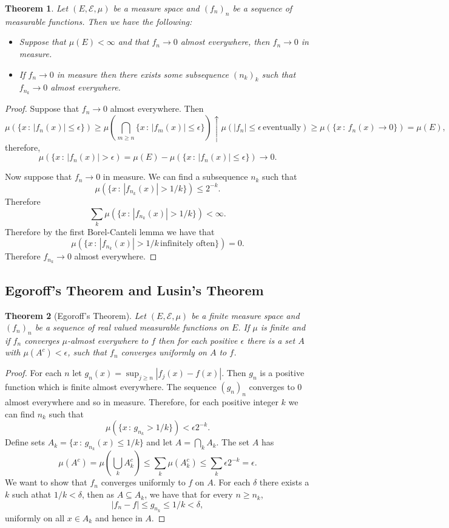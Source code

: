 \documentclass[11pt]{article}
\newtheorem{thm}{Theorem}[section]
\theoremstyle{definition}
\theoremstyle{remark}
\begin{document}
\begin{thm}
Let $(E, \mathcal{E}, \mu)$ be a measure space and $(f_n)_n$ be a sequence of measurable functions. Then we have the following:
\begin{itemize}
\item Suppose that $\mu(E) < \infty$ and that $f_n \rightarrow 0$ almost everywhere, then $f_n \rightarrow 0$ in measure.
\item If $f_n \rightarrow 0$ in measure then there exists some subsequence $(n_k)_k$ such that $f_{n_k} \rightarrow 0$ almost everywhere.
\end{itemize}
\end{thm}
\begin{proof}
Suppose that $f_n \rightarrow 0$ almost everywhere. Then 
\[ \mu(\{ x\,:\, |f_n(x)| \leq \epsilon \}) \geq \mu \left( \bigcap_{m \geq n} \{ x \,:\, |f_m(x)| \leq \epsilon\}\right) \uparrow \mu \left(|f_n| \leq \epsilon \, \mbox{eventually} \right) \geq \mu(\{ x \,:\, f_n(x) \rightarrow 0\}) = \mu(E), \] therefore,
\[ \mu(\{ x\,:\, |f_n(x)|> \epsilon) = \mu(E) - \mu(\{ x\,:\, |f_n(x)| \leq \epsilon \}) \rightarrow 0. \]

Now suppose that $f_n \rightarrow 0$ in measure. We can find a subsequence $n_k$ such that
\[ \mu(\{ x \,:\, |f_{n_k}(x)| > 1/k \}) \leq 2^{-k}. \] Therefore
\[ \sum_k \mu(\{ x \,:\, |f_{n_k}(x)| > 1/k \})<\infty.\] Therefore by the first Borel-Canteli lemma we have that
\[ \mu \left(\{ x\,:\, |f_{n_k}(x)|>1/k \, \mbox{infinitely often}\} \right) = 0. \] Therefore $f_{n_k} \rightarrow 0$ almost everywhere.
\end{proof}

\subsection{Egoroff's Theorem and Lusin's Theorem}
\begin{thm}[Egoroff's Theorem]
Let $(E, \mathcal{E}, \mu)$ be a finite measure space and $(f_n)_n$ be a sequence of real valued measurable functions on $E$. If $\mu$ is finite and if $f_n$ converges $\mu$-almost everywhere to $f$ then for each positive $\epsilon$ there is a set $A$ with $\mu(A^c)< \epsilon$, such that $f_n$ converges uniformly on $A$ to $f$.
\end{thm}
\begin{proof}
For each $n$ let $g_n(x) = \sup_{j \geq n}|f_j(x)-f(x)|$. Then $g_n$ is a positive function which is finite almost everywhere. The sequence $(g_n)_n$ converges to 0 almost everywhere and so in measure. Therefore, for each positive integer $k$ we can find $n_k$ such that
\[ \mu \left( \{ x \,:\, g_{n_k} > 1/k \} \right) < \epsilon 2^{-k}.  \] Define sets $A_k = \{ x\,:\, g_{n_k}(x) \leq 1/k\}$ and let $A= \bigcap_k A_k$. The set $A$ has
\[ \mu(A^c) = \mu \left( \bigcup_k A_k^c \right) \leq \sum_k \mu(A_k^c) \leq \sum_k \epsilon 2^{-k} = \epsilon. \] We want to show that $f_n$ converges uniformly to $f$ on $A$. For each $\delta$ there exists a $k$ such athat $1/k < \delta$, then as $A \subseteq A_k$, we have that for every $n \geq n_k$,
\[ |f_n - f| \leq g_{n_k} \leq 1/k < \delta, \] uniformly on all $x \in A_k$ and hence in $A$.
\end{proof}
\end{document}
